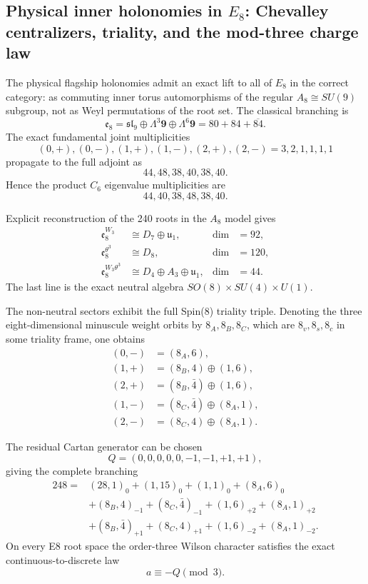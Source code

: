 \subsection{Physical inner holonomies in \(E_8\): Chevalley centralizers, triality, and the mod-three charge law}
\label{sec:20260918-physical-e8-holonomy}

The physical flagship holonomies admit an exact lift to all of \(E_8\) in the
correct category: as commuting inner torus automorphisms of the regular
\(A_8\cong SU(9)\) subgroup, not as Weyl permutations of the root set.
The classical branching is
\[
\mathfrak e_8=\mathfrak{sl}_9\oplus\Lambda^3\mathbf9\oplus\Lambda^6\mathbf9
=80+84+\overline{84}.
\]
The exact fundamental joint multiplicities
\[
(0,+),(0,-),(1,+),(1,-),(2,+),(2,-)=3,2,1,1,1,1
\]
propagate to the full adjoint as
\[
\boxed{44,48,38,40,38,40}.
\]
Hence the product \(C_6\) eigenvalue multiplicities are
\[\boxed{44,40,38,48,38,40}.\]

Explicit reconstruction of the 240 roots in the \(A_8\) model gives
\[
\begin{aligned}
\mathfrak e_8^{W_3}&\cong D_7\oplus\mathfrak u_1, &\dim&=92,\\
\mathfrak e_8^{\theta^3}&\cong D_8, &\dim&=120,\\
\mathfrak e_8^{W_3\theta^3}&\cong D_4\oplus A_3\oplus\mathfrak u_1, &\dim&=44.
\end{aligned}
\]
The last line is the exact neutral algebra \(SO(8)\times SU(4)\times U(1)\).

The non-neutral sectors exhibit the full Spin(8) triality triple.  Denoting the
three eight-dimensional minuscule weight orbits by \(8_A,8_B,8_C\), which are
\(8_v,8_s,8_c\) in some triality frame, one obtains
\[
\begin{aligned}
(0,-)&=(8_A,6),\\
(1,+)&=(8_B,4)\oplus(1,6),\\
(2,+)&=(8_B,\bar4)\oplus(1,6),\\
(1,-)&=(8_C,\bar4)\oplus(8_A,1),\\
(2,-)&=(8_C,4)\oplus(8_A,1).
\end{aligned}
\]

The residual Cartan generator can be chosen
\[Q=(0,0,0,0,0,-1,-1,+1,+1),\]
giving the complete branching
\[
\begin{aligned}
248={}&(28,1)_0+(1,15)_0+(1,1)_0+(8_A,6)_0\\
&+(8_B,4)_{-1}+(8_C,\bar4)_{-1}+(1,6)_{+2}+(8_A,1)_{+2}\\
&+(8_B,\bar4)_{+1}+(8_C,4)_{+1}+(1,6)_{-2}+(8_A,1)_{-2}.
\end{aligned}
\]
On every E8 root space the order-three Wilson character satisfies the exact
continuous-to-discrete law
\[\boxed{a\equiv-Q\pmod3}.\]

